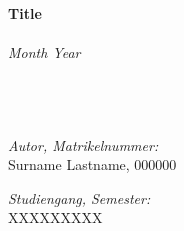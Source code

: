 \begin{titlepage}
		\begin{center}
			{
				\Huge
				\textbf{Title}
			}
			\ \\\ \\
			{
				\LARGE
				\emph{Month Year}\\
			}
			\ \\\ \\\ \\

			\begin{minipage}{0.4\textwidth}
				\begin{flushleft} \large
					\emph{Autor, Matrikelnummer:}\\
					Surname Lastname, 000000
				\end{flushleft}
			\end{minipage}
			\hfill
			\begin{minipage}{0.5\textwidth}
				\begin{flushright} \large
					\emph{Studiengang, Semester:} \\
					XXXXXXXXX
				\end{flushright}
			\end{minipage}\\[0.5cm]
			\ \\\ \\\ \\\ \\
			\begin{figure}[h]
				\hspace*{1.8cm} 
			\end{figure}	
		\end{center}
\end{titlepage}
\newpage
